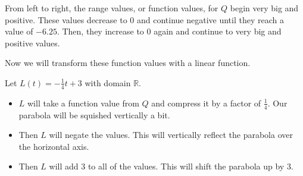 \documentclass{ximera}
\begin{document}
\begin{image}
\end{image}



From left to right, the range values, or function values, for $Q$ begin very big and positive.  These values decrease to $0$ and continue negative until they reach a value of $-6.25$. Then, they increase to $0$ again and continue to very big and positive values.

Now we will transform these function values with a linear function.


Let $L(t) = -\frac{1}{4} t + 3$ with domain $\mathbb{R}$.


\begin{itemize}
\item $L$ will take a function value from $Q$ and compress it by a factor of $\frac{1}{4}$. Our parabola will be squished vertically a bit. 
\item Then $L$ will negate the values.  This will vertically reflect the parabola over the horizontal axis.
\item Then $L$ will add $3$ to all of the values.  This will shift the parabola up by $3$.
\end{itemize}
\end{document}
